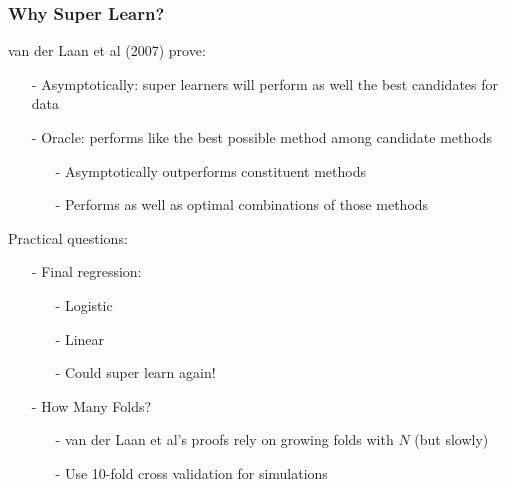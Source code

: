 \documentclass{beamer}
\numberwithin{equation}{section}
\begin{document}
\begin{frame}




\end{frame}



\begin{frame}
\frametitle{Why Super Learn?}

van der Laan et al (2007) prove:
\begin{itemize}
\item[-] \alert{Asymptotically}: super learners will perform as well the \alert{best} candidates for data
\item[-] \alert{Oracle}: performs like the best possible method among candidate methods
\begin{itemize}
\item[-] Asymptotically outperforms constituent methods
\item[-] Performs as well as optimal combinations of those methods
\end{itemize}
\end{itemize}

Practical questions:
\begin{itemize}
\item[-] Final regression:
\begin{itemize}
\item[-] Logistic
\item[-] Linear
\item[-] \alert{Could super learn again!}
\end{itemize}
\item[-] How Many Folds?
\begin{itemize}
\item[-] van der Laan et al's proofs rely on growing folds with $N$ (but slowly)
\item[-] Use 10-fold cross validation for simulations
\end{itemize}
\end{itemize}


\end{frame}
\end{document}
